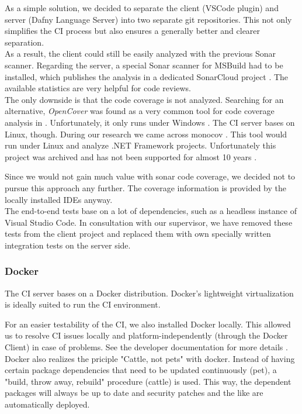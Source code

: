 As a simple solution, we decided to separate the client (VSCode plugin) and server (Dafny Language Server) into two separate git repositories.
This not only simplifies the CI process but also ensures a generally better and clearer separation. \\

As a result, the client could still be easily analyzed with the previous Sonar scanner.
Regarding the server, a special Sonar scanner for MSBuild had to be installed, which publishes the analysis in a dedicated SonarCloud project \cite{dev}. The available statistics are very helpful for code reviews. \\

The only downside is that the code coverage is not analyzed. Searching for an alternative, \textit{OpenCover} was found as a very common tool for code coverage analysis in \Csharp. Unfortunately, it only runs under Windows  \cite{opencover}. The CI server bases on Linux, though.
During our research we came across monocov \cite{monocov}. This tool would run under Linux and analyze .NET Framework projects. Unfortunately this project was archived and has not been supported for almost 10 years \cite{monocov}.

Since we would not gain much value with sonar code coverage, we decided not to pursue this approach any further. The coverage information is provided by the locally installed IDEs anyway.\\

The end-to-end tests base on a lot of dependencies, such as a headless instance of Visual Studio Code.
In consultation with our supervisor, we have removed these tests from the client project and replaced them with own specially written integration tests on the server side.

\subsubsection{Docker}
The CI server bases on a Docker distribution. Docker's lightweight virtualization is ideally suited to run the CI environment.

For an easier testability of the CI, we also installed Docker locally. This allowed us to resolve CI issues locally and platform-independently (through the Docker Client) in case of problems. See the developer documentation for more details \cite{dev}. \\

Docker also realizes the priciple "Cattle, not pets" with docker. 
Instead of having certain package dependencies that need to be updated continuously (pet), a "build, throw away, rebuild" procedure (cattle) is used. This way, the dependent packages will always be up to date and security patches and the like are automatically deployed. \\

